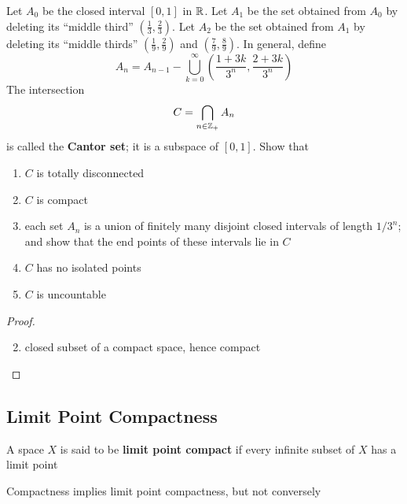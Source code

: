 \documentclass[11pt]{article}
\begin{document}
\begin{exercise}
\label{ex27.6}
Let \(A_0\) be the closed interval \([0,1]\) in \(\mathbb{R}\). Let \(A_1\) be the set obtained
from \(A_0\) by deleting its ``middle third'' \((\frac{1}{3},\frac{2}{3})\). Let \(A_2\) be the set
obtained from \(A_1\) by deleting its ``middle thirds'' \((\frac{1}{9},\frac{2}{9})\)
and \((\frac{7}{9},\frac{8}{9})\). In general, define
\begin{equation*}
A_n=A_{n-1}-\bigcup_{k=0}^\infty\left(
\frac{1+3k}{3^n},\frac{2+3k}{3^n}
\right)
\end{equation*}
The intersection
\begin{equation*}
C=\bigcap_{n\in\mathbb{Z}_+}A_n
\end{equation*}
is called the \textbf{Cantor set}; it is a subspace of \([0,1]\). Show that
\begin{enumerate}
\item \(C\) is totally disconnected
\item \(C\) is compact
\item each set \(A_n\) is a union of finitely many disjoint closed intervals of length \(1/3^n\); and
show that the end points of these intervals lie in \(C\)
\item \(C\) has no isolated points
\item \(C\) is uncountable
\end{enumerate}
\end{exercise}

\begin{proof}
\begin{enumerate}
\setcounter{enumi}{1}
\item closed subset of a compact space, hence compact
\end{enumerate}
\end{proof}


\subsection{Limit Point Compactness}
\label{sec:org5f693fe}
\begin{definition}[]
A space \(X\) is said to be \textbf{limit point compact} if every infinite subset of \(X\) has a limit point
\end{definition}

\begin{theorem}[]
Compactness implies limit point compactness, but not conversely
\end{theorem}
\end{document}
